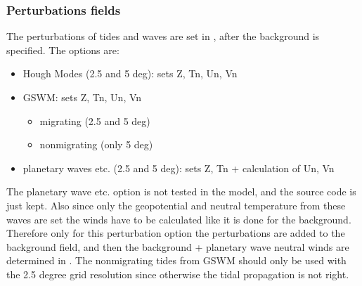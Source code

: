 \subsubsection*{Perturbations fields}
%
The perturbations of tides and waves are set in , after the background is
specified. The options are:
%
\begin{itemize}
  \item Hough Modes (2.5 and 5 deg): sets Z, Tn, Un, Vn
  \item GSWM: sets Z, Tn,  Un, Vn
     \begin{itemize}
         \item migrating (2.5 and 5 deg)
         \item nonmigrating (only 5 deg)
      \end{itemize} 
  \item planetary waves etc. (2.5 and 5 deg): sets Z, Tn + calculation of Un, Vn
\end{itemize} 
%
The planetary wave etc. option is not tested in the model, and the source code is 
just kept. Also since only the geopotential and neutral temperature from these waves are set the winds
have to be calculated like it is done for the background. Therefore
only for this perturbation option the perturbations are added to the background
field, and then the background + planetary wave neutral winds are determined in . The
nonmigrating tides from GSWM should only be used with the 2.5 degree grid
resolution since otherwise the tidal propagation is not right. 

